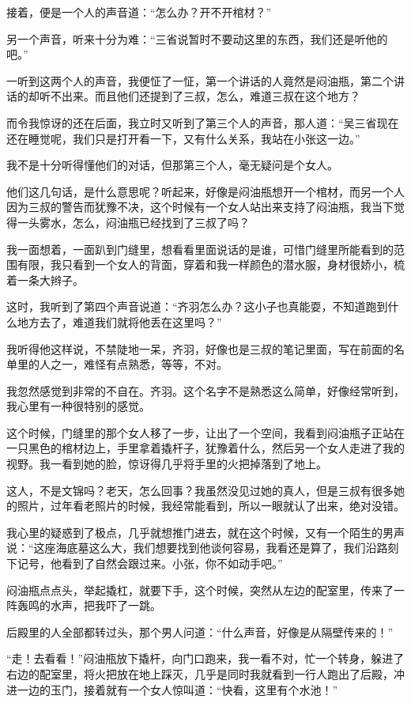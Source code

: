 接着，便是一个人的声音道：“怎么办？开不开棺材？”

另一个声音，听来十分为难：“三省说暂时不要动这里的东西，我们还是听他的吧。”

一听到这两个人的声音，我便怔了一怔，第一个讲话的人竟然是闷油瓶，第二个讲话的却听不出来。而且他们还提到了三叔，怎么，难道三叔在这个地方？

而令我惊讶的还在后面，我立时又听到了第三个人的声音，那人道：“吴三省现在还在睡觉呢，我们只是打开看一下，又有什么关系，我站在小张这一边。”

我不是十分听得懂他们的对话，但那第三个人，毫无疑问是个女人。

他们这几句话，是什么意思呢？听起来，好像是闷油瓶想开一个棺材，而另一个人因为三叔的警告而犹豫不决，这个时候有一个女人站出来支持了闷油瓶，我当下觉得一头雾水，怎么，闷油瓶已经找到了三叔了吗？

我一面想着，一面趴到门缝里，想看看里面说话的是谁，可惜门缝里所能看到的范围有限，我只看到一个女人的背面，穿着和我一样颜色的潜水服，身材很娇小，梳着一条大辫子。

这时，我听到了第四个声音说道：“齐羽怎么办？这小子也真能耍，不知道跑到什么地方去了，难道我们就将他丢在这里吗？”

我听得他这样说，不禁陡地一呆，齐羽，好像也是三叔的笔记里面，写在前面的名单里的人之一，难怪有点熟悉，等等，不对。

我忽然感觉到非常的不自在。齐羽。这个名字不是熟悉这么简单，好像经常听到，我心里有一种很特别的感觉。

这个时候，门缝里的那个女人移了一步，让出了一个空间，我看到闷油瓶子正站在一只黑色的棺材边上，手里拿着撬杆子，犹豫着什么，然后另一个女人走进了我的视野。我一看到她的脸，惊讶得几乎将手里的火把掉落到了地上。

这人，不是文锦吗？老天，怎么回事？我虽然没见过她的真人，但是三叔有很多她的照片，过年看老照片的时候，我经常能看到，所以一眼就认了出来，绝对没错。

我心里的疑惑到了极点，几乎就想推门进去，就在这个时候，又有一个陌生的男声说：“这座海底墓这么大，我们想要找到他谈何容易，我看还是算了，我们沿路刻下记号，他看到了自然会跟过来。小张，你不如动手吧。”

闷油瓶点点头，举起撬杠，就要下手，这个时候，突然从左边的配室里，传来了一阵轰鸣的水声，把我吓了一跳。

后殿里的人全部都转过头，那个男人问道：“什么声音，好像是从隔壁传来的！”

“走！去看看！”闷油瓶放下撬杆，向门口跑来，我一看不对，忙一个转身，躲进了右边的配室里，将火把放在地上踩灭，几乎是同时我就看到一行人跑出了后殿，冲进一边的玉门，接着就有一个女人惊叫道：“快看，这里有个水池！”

